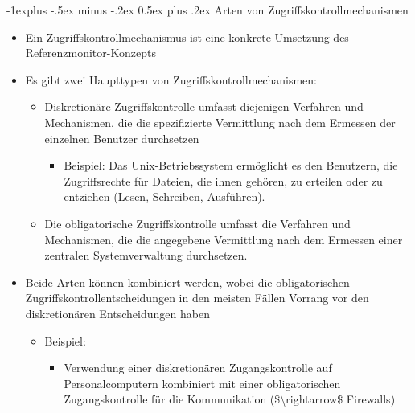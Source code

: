 \documentclass[a4paper]{article}
\makeatletter
\renewcommand{\subsection}{\@startsection{subsection}{2}{0mm}%
 {-1explus -.5ex minus -.2ex}%
 {0.5ex plus .2ex}%
 {\normalfont\normalsize\bfseries}}
\makeatother
\begin{document}
\begin{multicols}{3}
    \subsection{Arten von
        Zugriffskontrollmechanismen}

    \begin{itemize}
        \item
              Ein Zugriffskontrollmechanismus ist eine konkrete Umsetzung des
              Referenzmonitor-Konzepts
        \item
              Es gibt zwei Haupttypen von Zugriffskontrollmechanismen:

              \begin{itemize}
                  \item
                        Diskretionäre Zugriffskontrolle umfasst diejenigen Verfahren und
                        Mechanismen, die die spezifizierte Vermittlung nach dem Ermessen der
                        einzelnen Benutzer durchsetzen

                        \begin{itemize}
                            \item
                                  Beispiel: Das Unix-Betriebssystem ermöglicht es den Benutzern, die
                                  Zugriffsrechte für Dateien, die ihnen gehören, zu erteilen oder zu
                                  entziehen (Lesen, Schreiben, Ausführen).
                        \end{itemize}
                  \item
                        Die obligatorische Zugriffskontrolle umfasst die Verfahren und
                        Mechanismen, die die angegebene Vermittlung nach dem Ermessen einer
                        zentralen Systemverwaltung durchsetzen.
              \end{itemize}
        \item
              Beide Arten können kombiniert werden, wobei die obligatorischen
              Zugriffskontrollentscheidungen in den meisten Fällen Vorrang vor den
              diskretionären Entscheidungen haben

              \begin{itemize}
                  \item
                        Beispiel:

                        \begin{itemize}
                            \item
                                  Verwendung einer diskretionären Zugangskontrolle auf
                                  Personalcomputern kombiniert mit einer obligatorischen
                                  Zugangskontrolle für die Kommunikation
                                  (\$\textbackslash rightarrow\$ Firewalls)
                        \end{itemize}
              \end{itemize}
    \end{itemize}



\end{multicols}
\end{document}
